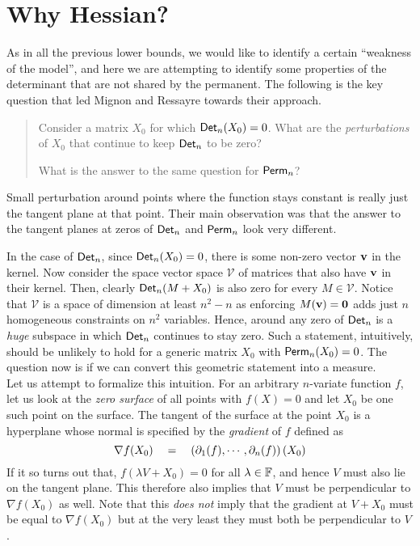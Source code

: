 \section{Why Hessian?}

As in all the previous lower bounds, we would like to identify a certain ``weakness of the model'', and here we are attempting to identify some properties of the determinant that are not shared by the permanent.
The following is the key question that led Mignon and Ressayre towards their approach. 
\begin{quote}
Consider a matrix $X_0$ for which $\operatorname{\mathsf{Det}}_n(X_0) = 0$. What are the \emph{perturbations} of $X_0$ that continue to keep $\operatorname{\mathsf{Det}}_n$ to be zero? 

What is the answer to the same question for $\operatorname{\mathsf{Perm}}_n$?
\end{quote}

Small perturbation around points where the function stays constant is really just the tangent plane at that point.
Their main observation was that the answer to the tangent planes at zeros of $\operatorname{\mathsf{Det}}_n$ and $\operatorname{\mathsf{Perm}}_n$ look very different.

In the case of $\operatorname{\mathsf{Det}}_n$, since $\operatorname{\mathsf{Det}}_n(X_0) = 0$, there is some non-zero vector $\mathbf{v}$ in the kernel.
Now consider the space vector space $\mathcal{V}$ of matrices that also have $\mathbf{v}$ in their kernel.
Then, clearly $\operatorname{\mathsf{Det}}_n(M + X_0)$ is also zero for every $M \in \mathcal{V}$.
Notice that $\mathcal{V}$ is a space of dimension at least $n^2 - n$ as enforcing $M(\mathbf{v}) = \mathbf{0}$ adds just $n$ homogeneous constraints on $n^2$ variables.
Hence, around any zero of $\operatorname{\mathsf{Det}}_n$ is a \emph{huge} subspace in which $\operatorname{\mathsf{Det}}_n$ continues to stay zero.
Such a statement, intuitively, should be unlikely to hold for a generic matrix $X_0$ with $\operatorname{\mathsf{Perm}}_n(X_0) = 0$.
The question now is if we can convert this geometric statement into a measure.\\

Let us attempt to formalize this intuition.
For an arbitrary $n$-variate function $f$, let us look at the \emph{zero surface} of all points with $f(X) = 0$ and let $X_0$ be one such point on the surface.
The tangent of the surface at the point $X_0$ is a hyperplane whose normal is specified by the \emph{gradient} of $f$ defined as
\[
\nabla f (X_0) \quad = \quad \left(\partial_{1}(f), \cdots, \partial_{n}(f)\right) (X_0)
\]
If it so turns out that, $f(\lambda V + X_0) = 0$ for all $\lambda \in \mathbb{F}$, and hence $V$ must also lie on the tangent plane.
This therefore also implies that $V$ must be perpendicular to $\nabla f (X_0)$ as well.
Note that this \emph{does not} imply that the gradient at $V + X_0$ must be equal to $\nabla f(X_0)$ but at the very least they must both be perpendicular to $V$. 


